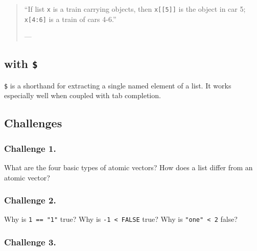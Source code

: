 \documentclass[]{book}
\newenvironment{Shaded}{\begin{snugshade}}{\end{snugshade}}
\newcommand{\CommentTok}[1]{\textcolor[rgb]{0.56,0.35,0.01}{\textit{#1}}}
\newcommand{\OperatorTok}[1]{\textcolor[rgb]{0.81,0.36,0.00}{\textbf{#1}}}
\newcommand{\NormalTok}[1]{#1}
\begin{document}
\begin{quote}
``If list \texttt{x} is a train carrying objects, then
\texttt{x{[}{[}5{]}{]}} is the object in car 5; \texttt{x{[}4:6{]}} is a
train of cars 4-6.''

--- \citet{RLangTip}
\end{quote}

\subsection{\texorpdfstring{with \texttt{\$}}{with \$}}\label{with-2}

\texttt{\$} is a shorthand for extracting a single named element of a
list. It works especially well when coupled with tab completion.

\begin{Shaded}
\end{Shaded}

\subsection{Challenges}\label{challenges-12}

\subsubsection*{Challenge 1.}\label{challenge-1.-9}

What are the four basic types of atomic vectors? How does a list differ
from an atomic vector?

\subsubsection*{Challenge 2.}\label{challenge-2.-8}

Why is \texttt{1\ ==\ "1"} true? Why is \texttt{-1\ \textless{}\ FALSE}
true? Why is \texttt{"one"\ \textless{}\ 2} false?

\subsubsection*{Challenge 3.}\label{challenge-3.-6}
\end{document}
